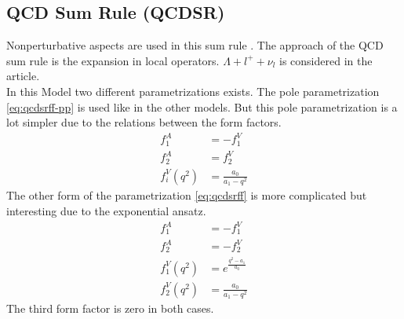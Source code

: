 \subsection{QCD Sum Rule (QCDSR)}
Nonperturbative aspects are used in this sum rule {\cite{QCDSR}}. The approach of 
the QCD sum rule is the expansion in local operators. \(\Lambda + l^+ + \nu_l\) 
is considered in the article.\\
In this Model two different parametrizations exists. The pole parametrization 
{\eqref{eq:qcdsrff-pp}} is used like in the other models. But this pole 
parametrization is a lot simpler due to the relations between the form factors.
\begin{align}
  f^A_1 & = - f^V_1 \nonumber \\
  f^A_2 & = f^V_2 \nonumber \\
  f^V_i(q^2) & = \frac{a_0}{a_1 - q^2} \label{eq:qcdsrff-pp}
\end{align} 
The other form of the parametrization {\eqref{eq:qcdsrff}} is more complicated 
but interesting due to the exponential ansatz.
\begin{align}
  f^A_1 & = - f^V_1 \nonumber \\
  f^A_2 & = - f^V_2 \nonumber \\
  f^V_1(q^2) & = e^{\frac{q^2 - a_1}{a_0}} \nonumber \\
  f^V_2(q^2) & = \frac{a_0}{a_1 - q^2} \label{eq:qcdsrff}
\end{align} 
The third form factor is zero in both cases.

